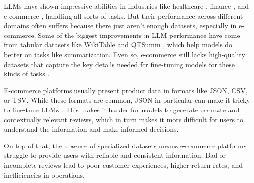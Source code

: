 \label{section:problema}
LLMs have shown impressive abilities in industries like healthcare \cite{He2023ReviewOS}, finance \cite{Varshney_2024}, and e-commerce \cite{peng2024ecellmgeneralizinglargelanguage}, handling all sorts of tasks. But their performance across different domains often suffers because there just aren't enough datasets, especially in e-commerce. Some of the biggest improvements in LLM performance have come from tabular datasets like WikiTable \cite{chen2021wikitabletlargescaledatatotextdataset} and QTSumm \cite{zhao2023qtsummqueryfocusedsummarizationtabular}, which help models do better on tasks like summarization. Even so, e-commerce still lacks high-quality datasets that capture the key details needed for fine-tuning models for these kinds of tasks \cite{macková2023promap}.

E-commerce platforms usually present product data in formats like JSON, CSV, or TSV. While these formats are common, JSON in particular can make it tricky to fine-tune LLMs \cite{gao2024jsontuning}. This makes it harder for models to generate accurate and contextually relevant reviews, which in turn makes it more difficult for users to understand the information and make informed decisions.

On top of that, the absence of specialized datasets means e-commerce platforms struggle to provide users with reliable and consistent information. Bad or incomplete reviews lead to poor customer experiences, higher return rates, and inefficiencies in operations.